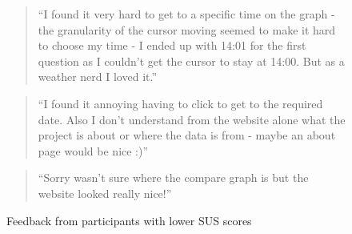 \begin{figure}[H]
  \centering
  \begin{minipage}{0.9\textwidth}
    \begin{quote}
    ``I found it very hard to get to a specific time on the graph - the
    granularity of the cursor moving seemed to make it hard to choose my time -
    I ended up with 14:01 for the first question as I couldn't get the cursor to
    stay at 14:00. But as a weather nerd I loved it.''
    \end{quote}
 \vspace{8pt}
    \begin{quote}
    ``I found it annoying having to click to get to the required date. Also I
    don't understand from the website alone what the project is about or where
    the data is from - maybe an about page would be nice :)''
    \end{quote}
 \vspace{8pt}
    \begin{quote}
    ``Sorry wasn’t sure where the compare graph is but the website looked really
    nice!''
    \end{quote}
  \end{minipage}
  \caption{Feedback from participants with lower SUS scores}
  \label{fig:low-sus-feedback}
\end{figure}


